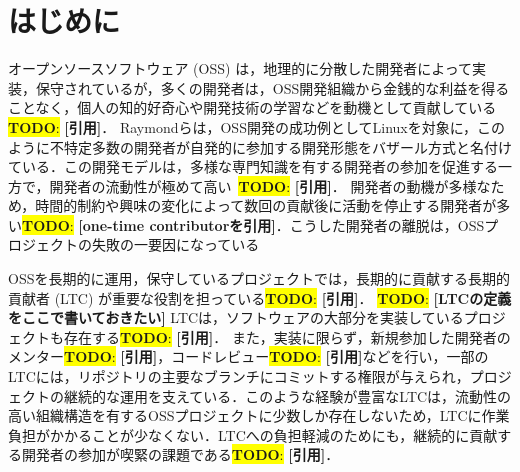 \documentclass[submit,techrep,noauthor]{ipsj}
\newcommand{\todo}[1]{\colorbox{yellow}{{\bf TODO}:}{\color{red} {\textbf{[#1]}}}}
\begin{document}
\maketitle

\section{はじめに}
オープンソースソフトウェア (OSS) は，地理的に分散した開発者によって実装，保守されているが，多くの開発者は，OSS開発組織から金銭的な利益を得ることなく，個人の知的好奇心や開発技術の学習などを動機として貢献している\todo{引用}．
Raymondらは，OSS開発の成功例としてLinuxを対象に，このように不特定多数の開発者が自発的に参加する開発形態をバザール方式と名付けている\cite{bazaar}．この開発モデルは，多様な専門知識を有する開発者の参加を促進する一方で，開発者の流動性が極めて高い~\todo{引用}．
開発者の動機が多様なため，時間的制約や興味の変化によって数回の貢献後に活動を停止する開発者が多い\todo{one-time contributorを引用}．こうした開発者の離脱は，OSSプロジェクトの失敗の一要因になっている\cite{failed}



OSSを長期的に運用，保守しているプロジェクトでは，長期的に貢献する長期的貢献者 (LTC) が重要な役割を担っている\todo{引用}．
\todo{LTCの定義をここで書いておきたい}
LTCは，ソフトウェアの大部分を実装しているプロジェクトも存在する\todo{引用}．
また，実装に限らず，新規参加した開発者のメンター\todo{引用}，コードレビュー\todo{引用}などを行い，一部のLTCには，リポジトリの主要なブランチにコミットする権限が与えられ，プロジェクトの継続的な運用を支えている．このような経験が豊富なLTCは，流動性の高い組織構造を有するOSSプロジェクトに少数しか存在しないため，LTCに作業負担がかかることが少なくない\cite{related2}．LTCへの負担軽減のためにも，継続的に貢献する開発者の参加が喫緊の課題である\todo{引用}．
\end{document}
